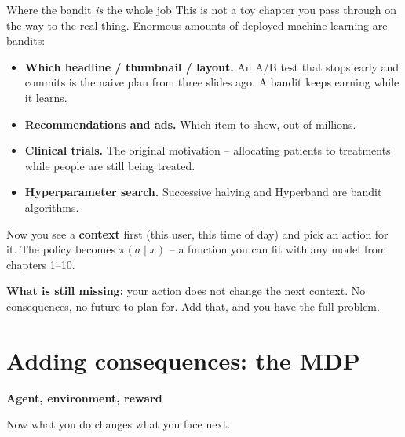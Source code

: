 \documentclass[aspectratio=169]{beamer}
\begin{document}
\begin{frame}{Where the bandit \emph{is} the whole job}
  \small
  This is not a toy chapter you pass through on the way to the real thing. Enormous amounts of
  deployed machine learning are bandits:

  \vskip 6pt
  \begin{itemize}\itemsep3pt
    \item \textbf{Which headline / thumbnail / layout.} An A/B test that stops early and commits
          is the naive plan from three slides ago. A bandit keeps earning while it learns.
    \item \textbf{Recommendations and ads.} Which item to show, out of millions.
    \item \textbf{Clinical trials.} The original motivation -- allocating patients to treatments
          while people are still being treated.
    \item \textbf{Hyperparameter search.} Successive halving and Hyperband are bandit algorithms.
  \end{itemize}

  \vskip 8pt
  \begin{tcolorbox}[colback=armblue!8, colframe=armblue, boxrule=0.6pt, arc=2pt,
                    title={\textbf{Contextual bandits}: one step closer}]
    \small
    Now you see a \textbf{context} first (this user, this time of day) and pick an action for it.
    The policy becomes $\pi(a \mid x)$ -- a function you can fit with any model from chapters
    1--10.

    \vskip 4pt
    \textbf{What is still missing:} your action does not change the next context. No consequences,
    no future to plan for. Add that, and you have the full problem.
  \end{tcolorbox}
\end{frame}

\section{Adding consequences: the MDP}
\begin{frame}[plain]
  \begin{center}
    \vskip 1.6cm
    {\Huge\bfseries\color{popblue}Agent, environment, reward}

    \vskip 0.6cm
    {\large Now what you do changes what you face next.}
  \end{center}
\end{frame}
\end{document}
